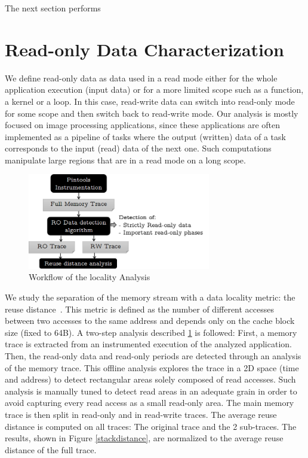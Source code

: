\documentclass[sigconf]{acmart}
\begin{document}
The next section performs 

\section{Read-only Data Characterization}


We define read-only data as data used in a read mode either for the whole application execution (input data) or for a more limited scope such as a function, a kernel or a loop. In this case, read-write data can switch into read-only mode for some scope and then switch back to read-write mode. Our analysis is mostly focused on image processing applications, since these applications are often implemented as a pipeline of tasks where the output (written) data of a task corresponds to the input (read) data of the next one. Such computations manipulate large regions that are in a read mode on a long scope.

\begin{figure}
    \centering
    \includegraphics[width=8cm]{./images/localityworkflow.png}
     \caption{Workflow of the locality Analysis}
    \label{localityworkflow}
\end{figure}
We study the separation of the memory stream with a data locality metric: the reuse distance~\cite{Coffman:1973}. This metric is defined as the number of different accesses between two accesses to the same address and depends only on the cache block size (fixed to 64B). A two-step analysis described \ref{localityworkflow} is followed: First, a memory trace is extracted from an instrumented execution of the analyzed application. Then, the read-only data and read-only periods are detected through an analysis of the memory trace. This offline analysis explores the trace in a 2D space (time and address) to detect rectangular areas solely composed of read accesses. Such analysis is manually tuned to detect read areas in an adequate grain in order to avoid capturing every read access as a small read-only area. The main memory trace is then split in read-only and in read-write traces. The average reuse distance is computed on all traces: The original trace and the 2 sub-traces. The results, shown in Figure \ref{stackdistance}, are normalized to the average reuse distance of the full trace.
\end{document}
